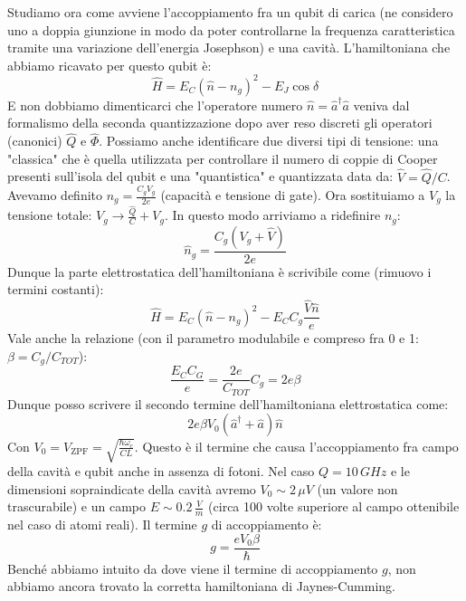 Studiamo ora come avviene l'accoppiamento fra un qubit di carica (ne considero uno a doppia giunzione in modo da poter controllarne la frequenza caratteristica tramite una variazione dell'energia Josephson) e una cavità. 
L'hamiltoniana che abbiamo ricavato per questo qubit è:
\begin{equation*}
    \hat H= E_C ( \hat n - n_g)^2 -E_J \cos \delta
\end{equation*}
E non dobbiamo dimenticarci che l'operatore numero $\hat n = \hat a^\dagger \hat a$ veniva dal formalismo della seconda quantizzazione dopo aver reso discreti gli operatori (canonici) $\hat Q$ e $\hat \Phi$.
Possiamo anche identificare due diversi tipi di tensione: una "classica" che è quella utilizzata per controllare il numero di coppie di Cooper presenti sull'isola del qubit e una "quantistica" e quantizzata data da: $\hat V = \hat Q / C$.
Avevamo definito $n_g = \frac{C_g V_g}{2e}$ (capacità e tensione di gate). Ora sostituiamo a $V_g$ la tensione totale: $V_g \rightarrow \frac{\hat Q}{C}+V_{g}$. In questo modo arriviamo a ridefinire $n_g$:
\begin{equation*}
    \hat n_g = \frac{C_g (V_g + \hat V)}{2e}
\end{equation*}
Dunque la parte elettrostatica dell'hamiltoniana è scrivibile come (rimuovo i termini costanti):
\begin{equation*}
    \hat H = E_C (\hat n -  n_g)^2 - E_C C_g \frac{\hat V \hat n}{e}
\end{equation*}
Vale anche la relazione (con il parametro modulabile e compreso fra 0 e 1: $\beta=C_g/C_{TOT}$):
\begin{equation*}
    \frac{E_C C_G}{e} = \frac{2e}{C_{TOT}}C_g = 2 e \beta
\end{equation*}
Dunque posso scrivere il secondo termine dell'hamiltoniana elettrostatica come:
\begin{equation*}
    2e\beta V_0 (\hat a^\dagger + \hat a ) \hat n
\end{equation*}
Con $V_0=V_{\text{ZPF}}=\sqrt{\frac{\hbar \omega_c}{CL}}$. Questo è il termine che causa l'accoppiamento fra campo della cavità e qubit anche in assenza di fotoni. Nel caso $Q=10\,GHz$ e le dimensioni sopraindicate della cavità avremo $V_0 \sim 2\, \mu V$ (un valore non trascurabile) e un campo $E\sim 0.2\, \frac{V}{m}$ (circa 100 volte superiore al campo ottenibile nel caso di atomi reali).
Il termine $g$ di accoppiamento è:
\begin{equation*}
    g = \frac{eV_0\beta}{\hbar}
\end{equation*}
Benché abbiamo intuito da dove viene il termine di accoppiamento $g$, non abbiamo ancora trovato la corretta hamiltoniana di Jaynes-Cumming.
